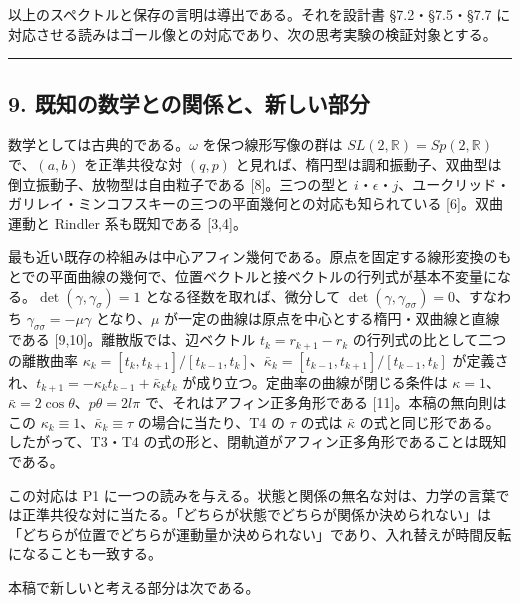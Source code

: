 \documentclass[
  a4paper,
]{ltjsarticle}
\begin{document}
以上のスペクトルと保存の言明は導出である。それを設計書 §7.2・§7.5・§7.7
に対応させる読みはゴール像との対応であり、次の思考実験の検証対象とする。

\begin{center}\rule{0.5\linewidth}{0.5pt}\end{center}

\subsection{9.
既知の数学との関係と、新しい部分}\label{ux65e2ux77e5ux306eux6570ux5b66ux3068ux306eux95a2ux4fc2ux3068ux65b0ux3057ux3044ux90e8ux5206}

数学としては古典的である。\(\omega\) を保つ線形写像の群は
\(SL(2,\mathbb R)=Sp(2,\mathbb R)\) で、\((a,b)\) を正準共役な対
\((q,p)\)
と見れば、楕円型は調和振動子、双曲型は倒立振動子、放物型は自由粒子である
{[}8{]}。三つの型と
\(i\)・\(\epsilon\)・\(j\)、ユークリッド・ガリレイ・ミンコフスキーの三つの平面幾何との対応も知られている
{[}6{]}。双曲運動と Rindler 系も既知である {[}3,4{]}。

最も近い既存の枠組みは中心アフィン幾何である。原点を固定する線形変換のもとでの平面曲線の幾何で、位置ベクトルと接ベクトルの行列式が基本不変量になる。\(\det(\gamma,\gamma_\sigma)=1\)
となる径数を取れば、微分して
\(\det(\gamma,\gamma_{\sigma\sigma})=0\)、すなわち
\(\gamma_{\sigma\sigma}=-\mu\gamma\) となり、\(\mu\)
が一定の曲線は原点を中心とする楕円・双曲線と直線である
{[}9,10{]}。離散版では、辺ベクトル \(t_k=r_{k+1}-r_k\)
の行列式の比として二つの離散曲率
\(\kappa_k=[t_k,t_{k+1}]/[t_{k-1},t_k]\)、\(\bar\kappa_k=[t_{k-1},t_{k+1}]/[t_{k-1},t_k]\)
が定義され、\(t_{k+1}=-\kappa_kt_{k-1}+\bar\kappa_kt_k\)
が成り立つ。定曲率の曲線が閉じる条件は
\(\kappa=1\)、\(\bar\kappa=2\cos\theta\)、\(p\theta=2l\pi\)
で、それはアフィン正多角形である {[}11{]}。本稿の無向則はこの
\(\kappa_k\equiv1\)、\(\bar\kappa_k\equiv\tau\) の場合に当たり、T4 の
\(\tau\) の式は \(\bar\kappa\) の式と同じ形である。したがって、T3・T4
の式の形と、閉軌道がアフィン正多角形であることは既知である。

この対応は P1
に一つの読みを与える。状態と関係の無名な対は、力学の言葉では正準共役な対に当たる。「どちらが状態でどちらが関係か決められない」は「どちらが位置でどちらが運動量か決められない」であり、入れ替えが時間反転になることも一致する。

本稿で新しいと考える部分は次である。
\end{document}
